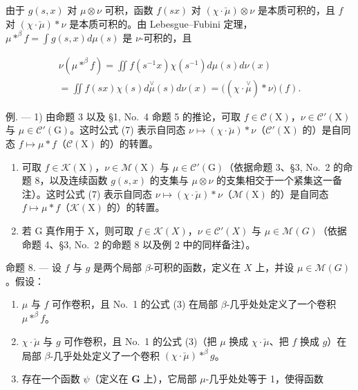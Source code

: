 由于 \(g(s, x)\) 对 \(\mu \otimes \nu\) 可积，函数 \(f(sx)\) 对 \((\chi \cdot \breve{\mu}) \otimes \nu\) 是本质可积的，且 \(f\) 对 \((\chi \cdot \breve{\mu}) * \nu\) 是本质可积的。由 Lebesgue--Fubini 定理，\(\mu *^{\beta} f = \int g(s, x) d\mu(s)\) 是 \(\nu\)-可积的，且

\[
\begin{array}{l} \nu (\mu * ^ {\beta} f) = \iint f (s ^ {- 1} x) \chi (s ^ {- 1}) d \mu (s) d \nu (x) \\ = \iint f (s x) \chi (s) d \stackrel {\vee} {\mu} (s) d \nu (x) = \big ((\chi \cdot \stackrel {\vee} {\mu}) * \nu \big) (f). \end{array}
\]

例. --- 1) 由命题 3 以及 §1, No.~4 命题 5 的推论，可取 \(f \in \mathcal{C}(\mathrm{X})\)，\(\nu \in \mathcal{C}'(\mathrm{X})\) 与 \(\mu \in \mathcal{C}'(\mathrm{G})\)。这时公式 (7) 表示自同态 \(\nu \mapsto (\chi \cdot \breve{\mu}) * \nu\)（\(\mathcal{C}'(\mathrm{X})\) 的）是自同态 \(f \mapsto \mu * f\)（\(\mathcal{C}(\mathrm{X})\) 的）的转置。

\begin{enumerate}
\def\labelenumi{\arabic{enumi})}
\setcounter{enumi}{1}
\item
  可取 \(f \in \mathcal{K}(\mathrm{X})\)，\(\nu \in \mathcal{M}(\mathrm{X})\) 与 \(\mu \in \mathcal{C}'(\mathrm{G})\)（依据命题 3、§3, No.~2 的命题 8，以及连续函数 \(g(s,x)\) 的支集与 \(\mu \otimes \nu\) 的支集相交于一个紧集这一备注）。这时公式 (7) 表示自同态 \(\nu \mapsto (\chi \cdot \breve{\mu}) * \nu\)（\(\mathcal{M}(\mathrm{X})\) 的）是自同态 \(f \mapsto \mu * f\)（\(\mathcal{K}(\mathrm{X})\) 的）的转置。
\item
  若 G 真作用于 X，则可取 \(f \in \mathcal{K}(X)\)，\(\nu \in \mathcal{C}'(X)\) 与 \(\mu \in \mathcal{M}(G)\)（依据命题 4、§3, No.~2 的命题 8 以及例 2 中的同样备注）。
\end{enumerate}

命题 8. --- 设 \(f\) 与 \(g\) 是两个局部 \(\beta\)-可积的函数，定义在 \(X\) 上，并设 \(\mu \in \mathcal{M}(G)\)。假设：

\begin{enumerate}
\def\labelenumi{(\roman{enumi})}
\item
  \(\mu\) 与 \(f\) 可作卷积，且 No.~1 的公式 (3) 在局部 \(\beta\)-几乎处处定义了一个卷积 \(\mu *^{\beta} f\)。
\item
  \(\chi \cdot \breve{\mu}\) 与 \(g\) 可作卷积，且 No.~1 的公式 (3)（把 \(\mu\) 换成 \(\chi \cdot \breve{\mu}\)、把 \(f\) 换成 \(g\)）在局部 \(\beta\)-几乎处处定义了一个卷积 \((\chi \cdot \breve{\mu}) *^{\beta} g\)。
\item
  存在一个函数 \(\psi\)（定义在 \(\mathbf{G}\) 上），它局部 \(\mu\)-几乎处处等于 1，使得函数
\end{enumerate}


